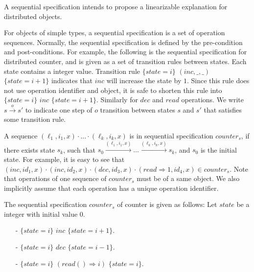 A sequential specification intends to propose a linearizable explanation for distributed objects.

For objects of simple types, a sequential specification is a set of operation sequences. Normally, the sequential specification is defined by the pre-condition and post-conditions. For example, the following is the sequential specification for distributed counter, and is given as a set of transition rules between states. Each state contains a integer value. Transition rule $\{ \mathit{state} = i \}$ $(\mathit{inc},\_,\_)$ $\{ \mathit{state} = i+1 \}$ indicates that $\mathit{inc}$ will increase the state by $1$. Since this rule does not use operation identifier and object, it is safe to shorten this rule into $\{ \mathit{state} = i \}$ $\mathit{inc}$ $\{ \mathit{state} = i+1 \}$. Similarly for $\mathit{dec}$ and $\mathit{read}$ operations. We write $s {\xrightarrow{o}} s'$ to indicate one step of $o$ transition between states $s$ and $s'$ that satisfies some transition rule.

A sequence $(\ell_1,i_1,x) \cdot \ldots \cdot (\ell_k,i_k,x)$ is in sequential specification $\mathit{counter}_s$, if there exists state $s_k$, such that $s_0 {\xrightarrow{(\ell_1,i_1,x)}} \ldots {\xrightarrow{(\ell_k,i_k,x)}} s_k$, and $s_0$ is the initial state. For example, it is easy to see that $(\mathit{inc},\mathit{id}_1,x) \cdot (\mathit{inc},\mathit{id}_2,x) \cdot (\mathit{dec},\mathit{id}_3,x) \cdot (\mathit{read} \Rightarrow 1,\mathit{id}_4,x) \in \mathit{counter}_s$. Note that operations of one sequence of $\mathit{counter}_s$ must be of a same object. We also implicitly assume that each operation has a unique operation identifier.


\begin{example}
\label{definition:sequential specification of counter}
The sequential specification $\mathit{counter}_s$ of counter is given as follows: Let $\mathit{state}$ be a integer with initial value $0$.

\begin{itemize}
\setlength{\itemsep}{0.5pt}
\item[-] $\{ \mathit{state} = i \}$ $\mathit{inc}$ $\{ \mathit{state} = i+1 \}$.
\item[-] $\{ \mathit{state} = i \}$ $\mathit{dec}$ $\{ \mathit{state} = i-1 \}$.
\item[-] $\{ \mathit{state} = i \}$ $(\mathit{read}() \Rightarrow i)$ $\{ \mathit{state} = i \}$.
\end{itemize}
\end{example}

